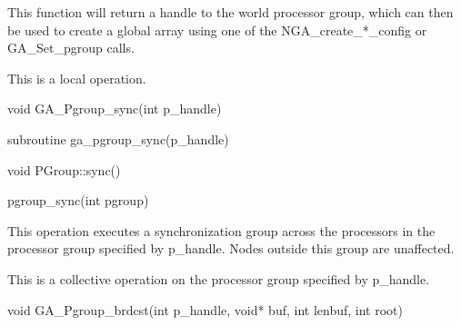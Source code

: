 \documentclass[12pt]{article}
\begin{document}
\begin{desc}

This function will return a handle to the world processor group, which can then be used to create a global array using one of the NGA_create_*_config or GA_Set_pgroup calls.

This is a local operation.
\end{desc}


\begin{capi}
\begin{ccode}
void GA_Pgroup_sync(int p_handle)
\end{ccode}
\begin{funcargs}
\end{funcargs}
\end{capi}

\begin{fapi}
\begin{fcode}
subroutine ga_pgroup_sync(p_handle)
\end{fcode}
\begin{funcargs}
\end{funcargs}
\end{fapi}

\begin{cxxapi}
\begin{cxxcode}
void PGroup::sync()
\end{cxxcode}
\end{cxxapi}

\begin{pyapi}
\begin{pycode}
pgroup_sync(int pgroup) 
\end{pycode}
\end{pyapi} 


\begin{desc}

This operation executes a synchronization group across the processors in the processor group specified by p_handle. Nodes outside this group are unaffected.

This is a collective operation on the processor group specified by p_handle. 
\end{desc}


\begin{capi}
\begin{ccode}
void GA_Pgroup_brdcst(int p_handle, void* buf, int lenbuf, int root)
\end{ccode}
\begin{funcargs}
\end{funcargs}
\end{capi}
\end{document}
